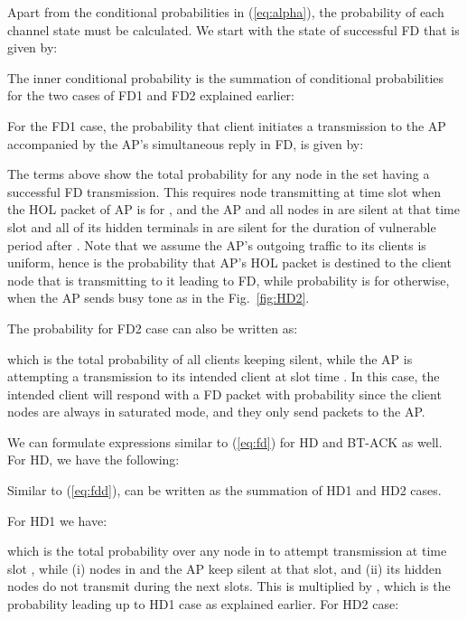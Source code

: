\documentclass[10pt,journal,cspaper,compsoc]{IEEEtran}
\begin{document}
Apart from the conditional probabilities in (\ref{eq:alpha}), the probability of each channel state must be calculated. We start with the state of successful FD that is given by:
\small

\normalsize

The inner conditional probability is the summation of conditional probabilities for the two cases of FD1 and FD2 explained earlier:
\small

\normalsize


For the FD1 case, the probability that client  initiates a transmission to the AP accompanied by the AP's simultaneous reply in FD, is given by:
\small

\normalsize

The terms above show the total probability for any node  in the set  having a successful FD transmission. This requires node  transmitting at time slot  when the HOL packet of AP is for , and the AP and all nodes in  are silent at that time slot and all of its hidden terminals in  are silent for the duration of vulnerable period  after . Note that we assume the AP's outgoing traffic to its clients is uniform, hence  is the probability that AP's HOL packet is destined to the client node that is transmitting to it leading to FD, while probability  is for otherwise, when the AP sends busy tone as in the Fig.~\ref{fig:HD2}.

The probability for FD2 case can also be written as: 
 \small

\normalsize

 which is the total probability of all clients keeping silent, while the AP is attempting a transmission to its intended client at slot time . In this case, the intended client will respond with a FD packet with probability  since the client nodes are always in saturated mode, and they only send packets to the AP. 

We can formulate expressions similar to (\ref{eq:fd}) for HD and BT-ACK as well. For HD, we have the following:
 \footnotesize
 
 \normalsize

Similar to (\ref{eq:fdd}),  can be written as the summation of HD1 and HD2 cases. 
\small

\normalsize

For HD1 we have:
  \small

\normalsize
which is the total probability over any node  in  to attempt transmission at time slot , while (i) nodes in  and the AP keep silent at that slot, and (ii) its hidden nodes do not transmit during the next  slots. This is multiplied by , which is the probability leading up to HD1 case as explained earlier. For HD2 case:
  \small
\end{document}
